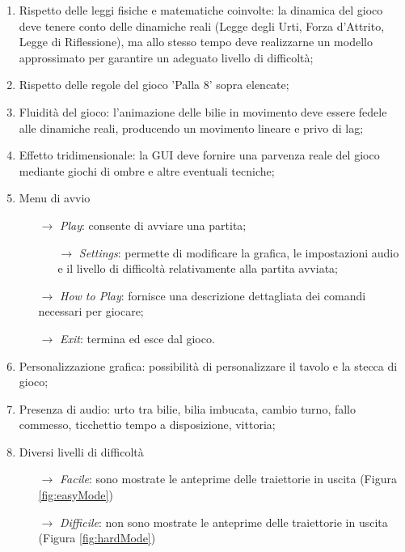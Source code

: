 \documentclass[12pt,a4paper]{report}
\begin{document}
\begin{enumerate}
    \item Rispetto delle leggi fisiche e matematiche coinvolte: la dinamica del gioco deve tenere conto delle dinamiche reali (Legge degli Urti, Forza d'Attrito, Legge di Riflessione), ma allo stesso tempo deve realizzarne un modello approssimato per garantire un adeguato livello di difficoltà;
    \item Rispetto delle regole del gioco 'Palla 8' sopra elencate;
    \item Fluidità del gioco: l'animazione delle bilie in movimento deve essere fedele alle dinamiche reali, producendo un movimento lineare e privo di lag;
    \item Effetto tridimensionale: la GUI deve fornire una parvenza reale del gioco mediante giochi di ombre e altre eventuali tecniche;
    \item Menu di avvio
    \begin{itemize}
        \item[$\rightarrow$] \emph{Play}: consente di avviare una partita;
        \begin{itemize}
        	\item[$\rightarrow$] \emph{Settings}: permette di modificare la grafica, le impostazioni audio e il livello di difficoltà relativamente alla partita avviata;
        \end{itemize}
        \item[$\rightarrow$] \emph{How to Play}: fornisce una descrizione dettagliata dei comandi necessari per giocare;
        \item[$\rightarrow$] \emph{Exit}: termina ed esce dal gioco.
    \end{itemize}
    \item Personalizzazione grafica: possibilità di personalizzare il tavolo e la stecca di gioco;
    \item Presenza di audio: urto tra bilie, bilia imbucata, cambio turno, fallo commesso, ticchettio tempo a disposizione, vittoria;
   	\pagebreak
    \item Diversi livelli di difficoltà
    \begin{itemize}
        \item[$\rightarrow$] \emph{Facile}: sono mostrate le anteprime delle traiettorie in uscita (Figura \ref{fig:easyMode})
        \item[$\rightarrow$] \emph{Difficile}: non sono mostrate le anteprime delle traiettorie in uscita (Figura \ref{fig:hardMode})
    \end{itemize}
\end{enumerate}
\end{document}
